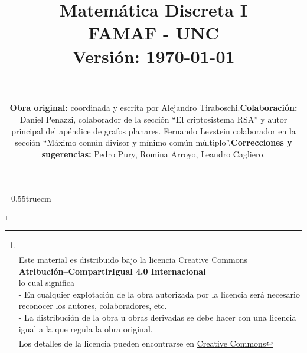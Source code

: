 \documentclass[11pt,spanish,makeidx]{amsbook}
\theoremstyle{definition}
\theoremstyle{remark}
\begin{document}
	\baselineskip=0.55truecm %


	\title{Matemática Discreta I \\ FAMAF  - UNC \\ Versión: \today
	 }

	\maketitle

	\newpage

	\author{
		${}^{}$
		\\${}^{}$
		\\${}^{}$
		 \\${}^{}$\\ 
		\flushleft 
		\begin{itemize}
			\item \textbf{Obra original:} coordinada y escrita por Alejandro Tiraboschi. 
			\item \textbf{Colaboración: } Daniel Penazzi, colaborador  de la sección ``El criptosistema RSA'' y autor principal del apéndice de grafos planares. Fernando Levstein colaborador en la sección ``Máximo común divisor y mínimo común  múltiplo''.   
			\item \textbf{Correcciones y sugerencias:} Pedro Pury, Romina Arroyo, Leandro Cagliero. 
		\end{itemize}
	}



	\vskip 2cm 
	\thanks{
		 \\
		${}^{}$\\
		{\flushleft 
			Este material es distribuido bajo la licencia Creative Commons} \\
		{\center \textbf{Atribución--CompartirIgual 4.0 Internacional}}
		\\ 
		\center  lo cual significa 
		\\
		\flushleft
		- En cualquier explotación de la obra autorizada por la licencia será necesario reconocer los autores, colaboradores, etc.\\
		- La distribución de la obra u obras derivadas se debe hacer con una licencia igual a la que regula la obra original.\\
		${}^{}$
		\\
		Los detalles de la licencia pueden encontrarse en \href{https://creativecommons.org/licenses/by/4.0/deed.es}{Creative Commons}
	}
\end{document}
